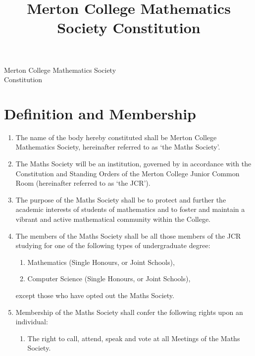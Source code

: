 \documentclass[pdftex,a4paper]{report}
\title{Merton College Mathematics Society Constitution}
\begin{document}
\begin{center}

	{\large Merton College Mathematics Society} \\[5pt]
	{\Huge Constitution}

\end{center}

\section*{Definition and Membership}

\begin{enumerate}[label=\Roman*)]
	\item The name of the body hereby constituted shall be Merton College Mathematics Society, hereinafter referred to as `the Maths Society'.
	\item The Maths Society will be an institution, governed by in accordance with the Constitution and Standing Orders of the Merton College Junior Common Room (hereinafter referred to as `the JCR').
	\item The purpose of the Maths Society shall be to protect and further the academic interests of students of mathematics and to foster and maintain a vibrant and active mathematical community within the College.
	\item The members of the Maths Society shall be all those members of the JCR studying for one of the following types of undergraduate degree:
	\begin{enumerate}[label=\roman*)]
		\item Mathematics (Single Honours, or Joint Schools),
		\item Computer Science (Single Honours, or Joint Schools),
	\end{enumerate}
	except those who have opted out the Maths Society.
	\item Membership of the Maths Society shall confer the following rights upon an individual:
	\begin{enumerate}[label=\roman*)]
		\item The right to call, attend, speak and vote at all Meetings of the Maths Society.

\end{enumerate}
\end{enumerate}
\end{document}
